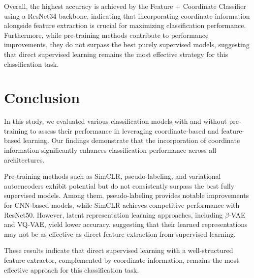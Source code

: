 \documentclass{article}
\begin{document}
Overall, the highest accuracy is achieved by the Feature + Coordinate
Classifier using a ResNet34 backbone, indicating that incorporating coordinate
information alongside feature extraction is crucial for maximizing
classification performance. Furthermore, while pre-training methods contribute
to performance improvements, they do not surpass the best purely supervised
models, suggesting that direct supervised learning remains the most effective
strategy for this classification task.

\section{Conclusion}

In this study, we evaluated various classification models with and without
pre-training to assess their performance in leveraging coordinate-based and
feature-based learning. Our findings demonstrate that the incorporation of
coordinate information significantly enhances classification performance across
all architectures.

Pre-training methods such as SimCLR, pseudo-labeling, and variational
autoencoders exhibit potential but do not consistently surpass the best fully
supervised models. Among them, pseudo-labeling provides notable improvements
for CNN-based models, while SimCLR achieves competitive performance with
ResNet50. However, latent representation learning approaches, including
$\beta$-VAE and VQ-VAE, yield lower accuracy, suggesting that their learned
representations may not be as effective as direct feature extraction from
supervised learning.

These results indicate that direct supervised learning with a well-structured
feature extractor, complemented by coordinate information, remains the most
effective approach for this classification task.



\end{document}
